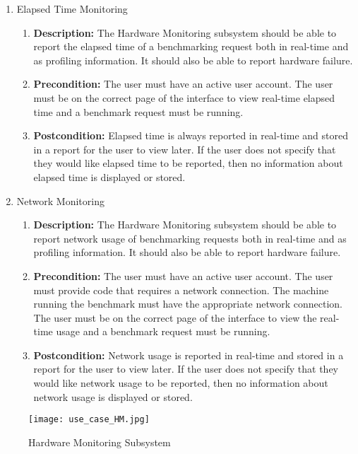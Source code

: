 \documentclass{article}
\begin{document}
\begin{enumerate}
\begin{enumerate}
        \item Elapsed Time Monitoring
		\begin{enumerate}
			\item \textbf{Description:} The Hardware Monitoring subsystem should be able to report the elapsed time of a benchmarking request both in real-time and as profiling information. It should also be able to report hardware failure.
			\item \textbf{Precondition:} The user must have an active user account. The user must be on the correct page of the interface to view real-time elapsed time and a benchmark request must be running. 
			\item \textbf{Postcondition:} Elapsed time is always reported in real-time and stored in a report for the user to view later. If the user does not specify that they would like elapsed time to be reported, then no information about elapsed time is displayed or stored.\newline
		\end{enumerate}
        
        \item Network Monitoring
		\begin{enumerate}
			\item \textbf{Description:} The Hardware Monitoring subsystem should be able to report network usage of benchmarking requests both in real-time and as profiling information. It should also be able to report hardware failure.
			\item \textbf{Precondition:} The user must have an active user account. The user must provide code that requires a network connection. The machine running the benchmark must have the appropriate network connection. The user must be on the correct page of the interface to view the real-time usage and a benchmark request must be running.
			\item \textbf{Postcondition:} Network usage is reported in real-time and stored in a report for the user to view later. If the user does not specify that they would like network usage to be reported, then no information about network usage is displayed or stored.\newline
		\end{enumerate}
        
	\end{enumerate}
	\begin{figure}[!ht]
    	\texttt{[image: use\_case\_HM.jpg]}
        \centering
		\caption{Hardware Monitoring Subsystem}	
	\end{figure}	
	

\end{enumerate}
\end{document}
